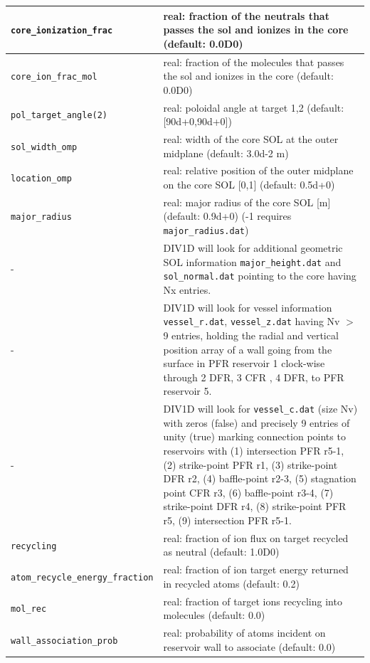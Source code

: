 \documentclass[amsmath,amssymb,a4]{revtex4-2}
\begin{document}
\begin{longtable}{| p{} | p{} |}
    {\tt core\_ionization\_frac } & real: fraction of the neutrals that passes the sol and ionizes in the core (default: 0.0D0) \\ \hline
       {\tt core\_ion\_frac\_mol } & real: fraction of the molecules that passes the sol and ionizes in the core (default: 0.0D0) \\ \hline 
    {\tt  pol\_target\_angle(2)}& real: poloidal angle at target 1,2 (default: [90d+0,90d+0]) \\ \hline  
    {\tt sol\_width\_omp}       & real: width of the core SOL at the outer midplane (default: 3.0d-2 m)\\ \hline  
    {\tt location\_omp }        & real: relative position of the outer midplane on the core SOL [0,1] 	(default: 0.5d+0) \\ \hline 
    {\tt major\_radius }        &  real:  major radius of the core SOL [m] (default: 0.9d+0) (-1 requires {\tt major\_radius.dat})\\ \hline    
    - & DIV1D will look for additional geometric SOL information {\tt major\_height.dat} and  {\tt sol\_normal.dat} pointing to the core having Nx entries. \\ \hline 
    - & DIV1D will look for vessel information   {\tt vessel\_r.dat}, {\tt vessel\_z.dat} having Nv $>$ 9 entries, holding the radial and vertical position array of a wall going from the surface in PFR reservoir 1 clock-wise through 2 DFR, 3 CFR , 4 DFR, to PFR reservoir 5. \\
    - & DIV1D will look for  {\tt vessel\_c.dat} (size Nv) with zeros (false) and precisely 9 entries of unity (true) marking connection points to reservoirs with (1) intersection PFR r5-1, (2) strike-point PFR r1, (3) strike-point DFR r2, (4) baffle-point r2-3, (5) stagnation point CFR r3, (6) baffle-point r3-4, (7) strike-point DFR r4, (8) strike-point PFR r5, (9) intersection PFR r5-1. \\ \hline
    {\tt recycling}             & real: fraction of ion flux on target recycled as neutral (default: 1.0D0) \\ \hline
    {\tt atom\_recycle\_energy\_fraction} & real: fraction of ion target energy returned in recycled atoms (default: 0.2) \\ \hline
    {\tt mol\_rec}              & real: fraction of target ions recycling into molecules (default: 0.0) \\ \hline
    {\tt wall\_association\_prob} & real: probability of atoms incident on reservoir wall to associate (default: 0.0) \\ \hline

\end{longtable}
\end{document}
